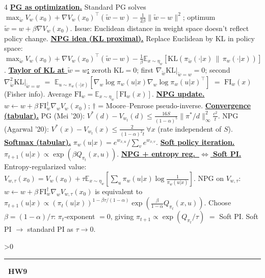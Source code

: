 \documentclass[10pt,landscape,letterpaper]{article}
\let\oldtextbf\textbf
\renewcommand{\textbf}[1]{\uline{\oldtextbf{#1}}}
\renewcommand{\section}[1]{%
  \ifnum\value{section}>0\par\vspace{1pt}\hrule\vspace{1pt}\fi
  \refstepcounter{section}\oldtextbf{\thesection\ #1}\ }
\begin{document}
\begin{multicols*}{4}
\textbf{PG as optimization.} Standard PG solves \(\max_{\tilde w}V_w(x_0)+\nabla V_w(x_0)^\top(\tilde w-w)-\tfrac{1}{2\beta}\|\tilde w-w\|^2\); optimum \(\tilde w=w+\beta\nabla V_w(x_0)\). Issue: Euclidean distance in weight space doesn't reflect policy change.
\textbf{NPG idea (KL proximal).} Replace Euclidean by KL in policy space: \(\max_{\tilde w}V_w(x_0)+\nabla V_w(x_0)^\top(\tilde w-w)-\tfrac{1}{\beta}\mathbb E_{x\sim\eta_w}[\mathrm{KL}(\pi_{\tilde w}(\cdot|x)\,\|\,\pi_w(\cdot|x))]\).
\textbf{Taylor of KL at \(\tilde w{=}w\):} zeroth \(\mathrm{KL}{=}0\); first \(\nabla_{\tilde w}\mathrm{KL}|_{\tilde w=w}{=}0\); second \(\nabla^2_{\tilde w}\mathrm{KL}|_{\tilde w=w}\) \(=\) \(\mathbb E_{u\sim\pi_w(\cdot|x)}[\nabla_w\log\pi_w(u|x)\nabla_w\log\pi_w(u|x)^\top]\) \(=\) \(\mathrm{FI}_w(x)\) (Fisher info). Average \(\mathrm{FI}_w=\mathbb E_{x\sim\eta_w}[\mathrm{FI}_w(x)]\).
\textbf{NPG update.} \(w\leftarrow w+\beta\,\mathrm{FI}_w^{\dagger}\nabla_w V_w(x_0)\); \(\dagger\) = Moore–Penrose pseudo-inverse.
\textbf{Convergence (tabular).}
PG (Mei '20): \(V^*(d)-V_{w_t}(d)\le\tfrac{16S}{(1-\alpha)^5}\|\pi^*/d\|_\infty^2\tfrac{c^2}{t}\).
NPG (Agarwal '20): \(V^*(x)-V_{w_t}(x)\le\tfrac{2}{(1-\alpha)^2 t}\ \forall x\) (rate independent of \(S\)).
\textbf{Softmax (tabular).} \(\pi_w(u|x)=e^{w_{x,u}}/\!\sum_v e^{w_{x,v}}\).
\textbf{Soft policy iteration.} \(\pi_{t+1}(u|x)\propto\exp(\beta Q_{\pi_t}(x,u))\).
\textbf{NPG + entropy reg.\ \(\Leftrightarrow\) Soft PI.}
Entropy-regularized value:
\(V_{w,\tau}(x_0)=V_w(x_0)+\tau\mathbb E_{x\sim\eta_w}[\sum_u\pi_w(u|x)\log\tfrac{1}{\pi_w(u|x)}]\).
NPG on \(V_{w,\tau}\): \(w\leftarrow w+\beta\,\mathrm{FI}_w^{\dagger}\nabla_w V_{w,\tau}(x_0)\) is equivalent to
\(\pi_{t+1}(u|x)\propto(\pi_t(u|x))^{1-\beta\tau/(1-\alpha)}\exp\!\left(\tfrac{\beta}{1-\alpha}Q_{\pi_t}(x,u)\right)\).
Choose \(\beta=(1-\alpha)/\tau\): \(\pi_t\)-exponent \(=0\), giving \(\pi_{t+1}\propto\exp(Q_{\pi_t}/\tau)\) \(=\) Soft PI.
Soft PI \(\to\) standard PI as \(\tau\to 0\).

\section{HW9}


\end{multicols*}
\end{document}
